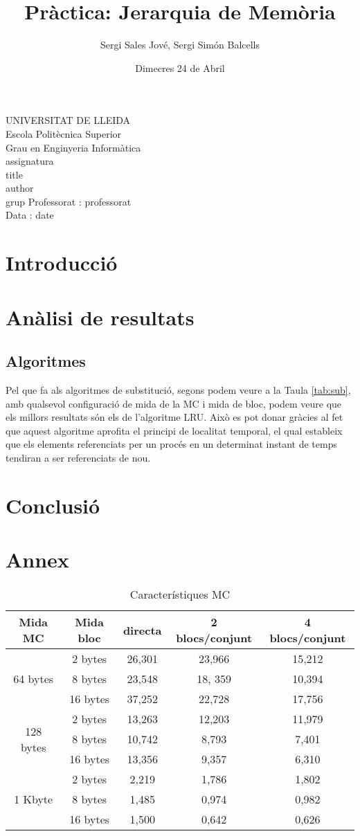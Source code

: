 \documentclass{article}
\title{Pràctica: Jerarquia de Memòria}
\author{Sergi Sales Jové, Sergi Simón Balcells}
\date{Dimecres 24 de Abril}
\renewcommand{\maketitle}{ %
    \begin{titlepage}
        \raggedright{UNIVERSITAT DE LLEIDA \\
            Escola Politècnica Superior \\
            Grau en Enginyeria Informàtica\\
            \1assignatura\\}
            \vspace{5cm}
            \centering\huge{\5title \\}
            \vspace{3cm}
            \large{\6author} \\
            \normalsize{\3grup}
            \vfill
            Professorat : \4professorat \\
            Data : \7date
\end{titlepage}}
\begin{document}
\maketitle
\thispagestyle{empty}

\newpage
{}
\tableofcontents
\newpage
{}
\section{Introducció}
\section{Anàlisi de resultats}
\subsection{Algoritmes}
Pel que fa als algoritmes de substitució, segons podem veure a la Taula \ref{tab:sub}, amb qualsevol configuració de mida de la MC i mida de bloc, podem veure que els millors resultats són els de l'algoritme LRU. Això es pot donar gràcies al fet que aquest algoritme aprofita el principi de localitat temporal, el qual estableix que els elements referenciats per un procés en un determinat instant de temps tendiran a ser referenciats de nou.
\section{Conclusió}
\section{Annex}

\begin{table}[!h]
\begin{tabular}{ |c|c|c|c|c| }
\hline
Mida MC& Mida bloc& directa& 2 blocs/conjunt& 4 blocs/conjunt \\
\hline
\multirow{3}{4em}{64 bytes} & 2 bytes & 26,301 & 23,966 & 15,212 \\
& 8 bytes & 23,548 & 18, 359 & 10,394 \\
& 16 bytes & 37,252 & 22,728 & 17,756 \\
\hline
\multirow{3}{4em}{128 bytes} & 2 bytes & 13,263 & 12,203 & 11,979 \\
& 8 bytes & 10,742 & 8,793 & 7,401 \\
& 16 bytes & 13,356 & 9,357 & 6,310 \\
\hline
\multirow{3}{4em}{1 Kbyte} & 2 bytes & 2,219 & 1,786 & 1,802 \\
& 8 bytes & 1,485 & 0,974 & 0,982 \\
& 16 bytes & 1,500 & 0,642 & 0,626 \\
\hline

\end{tabular}
\caption{Característiques MC}
\label{tab:mc}
\end{table}
\end{document}
